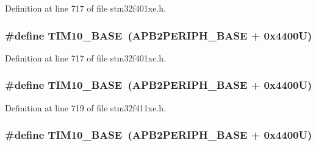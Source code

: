 Definition at line 717 of file stm32f401xe.\+h.

\subsubsection[{\texorpdfstring{T\+I\+M10\+\_\+\+B\+A\+SE}{TIM10_BASE}}]{\setlength{\rightskip}{0pt plus 5cm}\#define T\+I\+M10\+\_\+\+B\+A\+SE~({\bf A\+P\+B2\+P\+E\+R\+I\+P\+H\+\_\+\+B\+A\+SE} + 0x4400\+U)}\hypertarget{group___peripheral__registers__structures_ga3eff32f3801db31fb4b61d5618cad54a}{}\label{group___peripheral__registers__structures_ga3eff32f3801db31fb4b61d5618cad54a}


Definition at line 717 of file stm32f401xc.\+h.

\subsubsection[{\texorpdfstring{T\+I\+M10\+\_\+\+B\+A\+SE}{TIM10_BASE}}]{\setlength{\rightskip}{0pt plus 5cm}\#define T\+I\+M10\+\_\+\+B\+A\+SE~({\bf A\+P\+B2\+P\+E\+R\+I\+P\+H\+\_\+\+B\+A\+SE} + 0x4400\+U)}\hypertarget{group___peripheral__registers__structures_ga3eff32f3801db31fb4b61d5618cad54a}{}\label{group___peripheral__registers__structures_ga3eff32f3801db31fb4b61d5618cad54a}


Definition at line 719 of file stm32f411xe.\+h.

\subsubsection[{\texorpdfstring{T\+I\+M10\+\_\+\+B\+A\+SE}{TIM10_BASE}}]{\setlength{\rightskip}{0pt plus 5cm}\#define T\+I\+M10\+\_\+\+B\+A\+SE~({\bf A\+P\+B2\+P\+E\+R\+I\+P\+H\+\_\+\+B\+A\+SE} + 0x4400\+U)}\hypertarget{group___peripheral__registers__structures_ga3eff32f3801db31fb4b61d5618cad54a}{}\label{group___peripheral__registers__structures_ga3eff32f3801db31fb4b61d5618cad54a}


